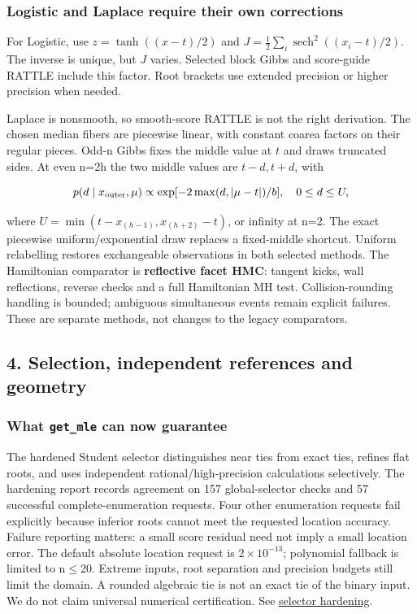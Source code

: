 \documentclass[
  10pt,
]{article}
\begin{document}
\subsubsection{Logistic and Laplace require their own
corrections}\label{logistic-and-laplace-require-their-own-corrections}

For Logistic, use \(z=\tanh((x-t)/2)\) and
\(J=\tfrac12\sum_i\operatorname{sech}^2((x_i-t)/2)\). The inverse is
unique, but \(J\) varies. Selected block Gibbs and score-guide RATTLE
include this factor. Root brackets use extended precision or higher
precision when needed.

Laplace is nonsmooth, so smooth-score RATTLE is not the right
derivation. The chosen median fibers are piecewise linear, with constant
coarea factors on their regular pieces. Odd-n Gibbs fixes the middle
value at \(t\) and draws truncated sides. At even n=2h the two middle
values are \(t-d,t+d\), with

\[
p(d\mid x_{\rm outer},\mu)\propto
\exp[-2\max(d,|\mu-t|)/b],\quad 0\le d\le U,
\]

where \(U=\min(t-x_{(h-1)},x_{(h+2)}-t)\), or infinity at n=2. The exact
piecewise uniform/exponential draw replaces a fixed-middle shortcut.
Uniform relabelling restores exchangeable observations in both selected
methods. The Hamiltonian comparator is \textbf{reflective facet HMC}:
tangent kicks, wall reflections, reverse checks and a full Hamiltonian
MH test. Collision-rounding handling is bounded; ambiguous simultaneous
events remain explicit failures. These are separate methods, not changes
to the legacy comparators.

\subsection{4. Selection, independent references and
geometry}\label{selection-independent-references-and-geometry}

\subsubsection{\texorpdfstring{What \texttt{get\_mle} can now
guarantee}{What get\_mle can now guarantee}}\label{what-get_mle-can-now-guarantee}

The hardened Student selector distinguishes near ties from exact ties,
refines flat roots, and uses independent rational/high-precision
calculations selectively. The hardening report records agreement on 157
global-selector checks and 57 successful complete-enumeration requests.
Four other enumeration requests fail explicitly because inferior roots
cannot meet the requested location accuracy. Failure reporting matters:
a small score residual need not imply a small location error. The
default absolute location request is \(2\times10^{-13}\); polynomial
fallback is limited to n\ensuremath{\le}20. Extreme inputs, root separation and
precision budgets still limit the domain. A rounded algebraic tie is not
an exact tie of the binary input. We do not claim universal numerical
certification. See \href{selected_mle_selector_hardening.md}{selector
hardening}.
\end{document}

